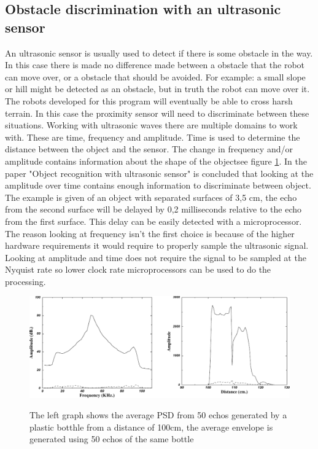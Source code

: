 \documentclass[10pt,a4paper]{article}
\begin{document}
\subsection{Obstacle discrimination with an ultrasonic sensor}
An ultrasonic sensor is usually used to detect if there is some obstacle in the way. In this case there is made no difference made between a obstacle that the robot can move over, or a obstacle that should be avoided. For example: a small slope or hill might be detected as an obstacle, but in truth the robot can move over it. The robots developed for this program will eventually be able to cross harsh terrain. In this case the proximity sensor will need to discriminate between these situations. Working with ultrasonic waves there are multiple domains to work with. These are time, frequency and amplitude. Time is used to determine the distance between the object and the sensor. The change in frequency and/or amplitude contains information about the shape of the object\cite{ultraobject}see figure \ref{ultrafreq}. In the paper "Object recognition with ultrasonic sensor" is concluded that looking at the amplitude over time contains enough information to discriminate between object\cite{ultraobject}. The example is given of an object with separated surfaces of 3,5 cm, the echo from the second surface will be delayed by 0,2 milliseconds relative to the echo from the first surface. This delay can be easily detected with a microprocessor. The reason looking at frequency isn't the first choice is because of the higher hardware requirements it would require to properly sample the ultrasonic signal. Looking at amplitude and time does not require the signal to be sampled at the Nyquist rate so lower clock rate microprocessors can be used to do the processing.
\\
\begin{figure}[h]
  \centering
      \includegraphics[width=1\textwidth]{ultrafreq.pdf}
  \caption{The left graph shows the average PSD from 50 echos generated by a plastic botthle from a distance of 100cm, the average envelope is generated using 50 echos of the same bottle} \cite{ultraobject}  \label{ultrafreq}
\end{figure}
\newpage
\end{document}
